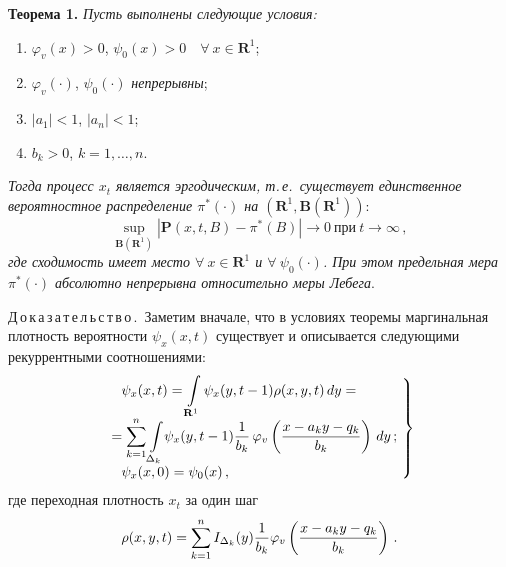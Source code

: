 \begin{multicols}{2}
  \smallskip
  
  \noindent
  \textbf{Теорема 1.} \textit{Пусть выполнены следующие условия:}
  \begin{enumerate}[(1)]
  \item $\varphi_v(x) >0$, $\psi_0(x)>0$\ \ $\forall\  x \in \mathbf{R}^1$;
\item $\varphi_v(\cdot)$, $\psi_0(\cdot)$ \textit{непрерывны};
\item $\vert a_1\vert <1$, $\vert a_n\vert <1$;
\item $b_k>0$, $k=1, \ldots , n$.
\end{enumerate}
  \textit{Тогда процесс $x_t$ является эргодическим, т.\,е.\ существует единственное 
вероятностное распределение $\pi^*(\cdot)$ на $(\mathbf{R}^1, \mathbf{B}(\mathbf{R}^1))$}:
  \begin{equation} 
  \sup\limits_{\mathbf{B}(\mathbf{R}^1)}\left\vert \mathbf{P}(x,t,B)-\pi^*(B)\right\vert 
\rightarrow 0\ \mbox{при}\ t\rightarrow\infty\,,
  \label{e4-b}
  \end{equation}
\textit{где сходимость имеет место $\forall\ x\in \mathbf{R}^1$ и $\forall\ \psi_0(\cdot)$. При 
этом предельная мера $\pi^*(\cdot)$ абсолютно непрерывна относительно меры Лебега}.

\smallskip

\noindent
  Д\,о\,к\,а\,з\,а\,т\,е\,л\,ь\,с\,т\,в\,о\,.\ Заметим вначале, что в условиях теоремы 
маргинальная плотность вероятности $\psi_x(x,t)$ существует и описывается следующими 
рекуррентными соотношениями:
  \begin{equation}
  \left.
  \begin{array}{l}
  \psi_x(x,t)=\displaystyle\int\limits_{\mathbf{R}^1}\psi_x(y,t-1)\rho(x,y,t)\,dy={}\\
\!\!\!\!\!\!  {}=\displaystyle\sum\limits_{k=1}^n \int\limits_{\Delta_k} \!\psi_x(y,t-1)\fr{1}{b_k}\,\varphi_v\left( \fr{x-a_ky-
q_k}{b_k}\right)\,dy\,;\\[12pt]
  \psi_x(x,0)=\psi_0(x)\,,
  \end{array}\!
  \right\}\!\!\!
  \label{e5-b}
  \end{equation}
где переходная плотность $x_t$ за один шаг
$$
\rho(x,y,t) =\sum\limits_{k=1}^n I_{\Delta_k}(y)\displaystyle\frac{\displaystyle 1\mathstrut}{\displaystyle b_k\mathstrut} \varphi_v \left( \displaystyle\frac{\displaystyle x-a_k y-
q_k\mathstrut}{\displaystyle b_k\mathstrut}\right)\,.
$$ 


\end{multicols}
